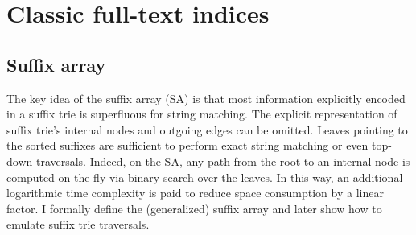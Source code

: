 \section{Classic full-text indices}

\subsection{Suffix array}
\label{sec:index:sa}

The key idea of the suffix array (SA) \citep{Manber1990} is that most information explicitly encoded in a suffix trie is superfluous for string matching.
The explicit representation of suffix trie's internal nodes and outgoing edges can be omitted.
Leaves pointing to the sorted suffixes are sufficient to perform exact string matching or even top-down traversals.
Indeed, on the SA, any path from the root to an internal node is computed on the fly via binary search over the leaves.
In this way, an additional logarithmic time complexity is paid to reduce space consumption by a linear factor.
I formally define the (generalized) suffix array and later show how to emulate suffix trie traversals.



